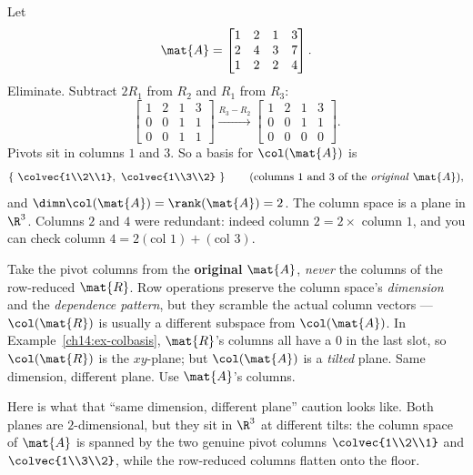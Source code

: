 \begin{example}
\label{ch14:ex-colbasis}
Let
\[
  \mat{A}=\begin{bmatrix} 1 & 2 & 1 & 3\\ 2 & 4 & 3 & 7\\ 1 & 2 & 2 & 4\end{bmatrix}.
\]
Eliminate. Subtract $2R_1$ from $R_2$ and $R_1$ from $R_3$:
\[
  \begin{bmatrix} 1 & 2 & 1 & 3\\ 0 & 0 & 1 & 1\\ 0 & 0 & 1 & 1\end{bmatrix}
  \xrightarrow{R_3-R_2}
  \begin{bmatrix} 1 & 2 & 1 & 3\\ 0 & 0 & 1 & 1\\ 0 & 0 & 0 & 0\end{bmatrix}.
\]
Pivots sit in columns $1$ and $3$. So a basis for $\col(\mat{A})$ is
\[
  \left\{\ \colvec{1\\2\\1},\ \colvec{1\\3\\2}\ \right\}
  \qquad(\text{columns } 1 \text{ and } 3 \text{ of the \emph{original} } \mat{A}),
\]
and $\dimn\col(\mat{A}) = \rank(\mat{A}) = 2$. The column space is a plane in
$\R^3$. Columns $2$ and $4$ were redundant: indeed column $2 = 2\times$ column $1$,
and you can check column $4 = 2(\text{col }1) + (\text{col }3)$.
\end{example}

\begin{trapbox}
Take the pivot columns from the \textbf{original} $\mat{A}$, \emph{never} the
columns of the row-reduced $\mat{R}$. Row operations preserve the column space's
\emph{dimension} and the \emph{dependence pattern}, but they scramble the actual
column vectors --- $\col(\mat{R})$ is usually a different subspace from
$\col(\mat{A})$. In Example~\ref{ch14:ex-colbasis}, $\mat{R}$'s columns all have a
$0$ in the last slot, so $\col(\mat{R})$ is the $xy$-plane; but $\col(\mat{A})$ is
a \emph{tilted} plane. Same dimension, different plane. Use $\mat{A}$'s columns.
\end{trapbox}

Here is what that ``same dimension, different plane'' caution looks like.
Both planes are $2$-dimensional, but they sit in $\R^3$ at different tilts: the
column space of $\mat{A}$ is spanned by the two genuine pivot columns
$\colvec{1\\2\\1}$ and $\colvec{1\\3\\2}$, while the row-reduced columns flatten
onto the floor.


